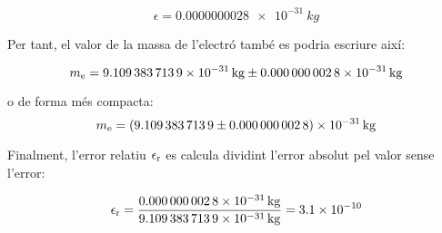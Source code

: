 \[
    \epsilon = \qty{0,000 000 0028 e-31}{kg}
\]

Per tant, el valor de la massa de l'electró també es podria escriure així:

 \[
    m\ped{e} = \qty[separate-uncertainty,separate-uncertainty-units = repeat]{9,109 383 7139(28) e-31}{kg}
\]

o de forma més compacta:
\[
m\ped{e} = \qty[separate-uncertainty,separate-uncertainty-units = bracket]{9,109 383 7139(28) e-31}{kg}
\]

Finalment, l'error relatiu $\epsilon_\mathrm{r}$ es calcula dividint l'error absolut pel valor sense l'error:

\[
    \epsilon_\mathrm{r} = \frac{\qty{0,000 000 0028 e-31}{kg}}{\qty{9,109 383 7139 e-31}{kg}} =   \num{3,1e-10}
\]
